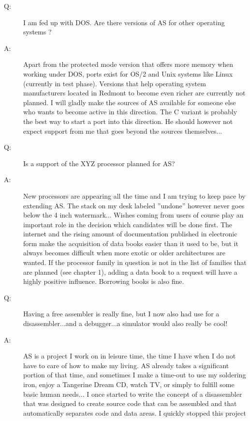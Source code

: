 \documentclass[12pt,twoside]{report}
\begin{document}
\begin{description}
\item[Q:]{I am fed up with DOS.  Are there versions of AS for other
   operating systems ?}
\item[A:]{Apart from the protected mode version that offers more memory when
   working under DOS, ports exist for OS/2 and Unix systems like
   Linux (currently in test phase).  Versions that help operating
   system manufacturers located in Redmont to become even richer are
   currently not planned.  I will gladly make the sources of AS
   available for someone else who wants to become active in this
   direction.  The C variant is probably the best way to start a
   port into this direction.  He should however not expect support
   from me that goes beyond the sources themselves...}
\vspace{0.3cm}
\item[Q:]{Is a support of the XYZ processor planned for AS?}
\item[A:]{New processors are appearing all the time and I am trying to keep
   pace by extending AS.  The stack on my desk labeled ''undone''
   however never goes below the 4 inch watermark... Wishes coming
   from users of course play an important role in the decision which
   candidates will be done first.  The internet and the rising amount
   of documentation published in electronic form make the acquisition
   of data books easier than it used to be, but it always becomes
   difficult when more exotic or older architectures are wanted.  If
   the processor family in question is not in the list of families
   that are planned (see chapter 1), adding a data book to a request
   will have a highly positive influence.  Borrowing books is also
   fine.}
\vspace{0.3cm}
\item[Q:]{Having a free assembler is really fine, but I now also had use for
   a disassembler...and a debugger...a simulator would also really be
   cool!}
\item[A:]{AS is a project I work on in leisure time, the time I have when I
   do not have to care of how to make my living.  AS already takes a
   significant portion of that time, and sometimes I make a time-out
   to use my soldering iron, enjoy a Tangerine Dream CD, watch TV, or
   simply to fulfill some basic human needs... I once started to
   write the concept of a disassembler that was designed to create
   source code that can be assembled and that automatically
   separates code and data areas.  I quickly stopped this project
}
\end{description}
\end{document}
